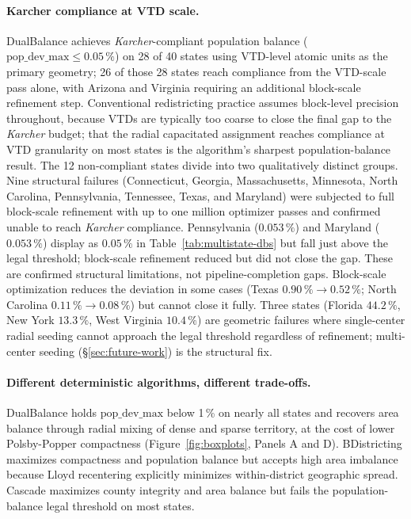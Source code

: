 \paragraph{Karcher compliance at VTD scale.}
DualBalance achieves \textit{Karcher}-compliant population balance
($\mathrm{pop\_dev\_max} \leq 0.05\,\%$) on 28 of 40 states using
VTD-level atomic units as the primary geometry; 26 of those 28 states
reach compliance from the VTD-scale pass alone, with Arizona and
Virginia requiring an additional block-scale refinement step.
Conventional redistricting practice assumes block-level precision
throughout, because VTDs are typically too coarse to close the final
gap to the \textit{Karcher} budget; that the radial capacitated
assignment reaches compliance at VTD granularity on most states is
the algorithm's sharpest population-balance result.
The 12 non-compliant states divide into two qualitatively distinct
groups. Nine structural failures (Connecticut, Georgia, Massachusetts,
Minnesota, North Carolina, Pennsylvania, Tennessee, Texas, and
Maryland) were subjected to full block-scale refinement with up to one
million optimizer passes and confirmed unable to reach
\textit{Karcher} compliance. Pennsylvania ($0.053\,\%$) and Maryland
($0.053\,\%$) display as $0.05\,\%$ in Table~\ref{tab:multistate-dbs}
but fall just above the legal threshold; block-scale refinement
reduced but did not close the gap. These are confirmed structural
limitations, not pipeline-completion gaps. Block-scale optimization
reduces the deviation in some cases (Texas $0.90\,\% \to 0.52\,\%$;
North Carolina $0.11\,\% \to 0.08\,\%$) but cannot close it fully.
Three states (Florida $44.2\,\%$, New York $13.3\,\%$,
West Virginia $10.4\,\%$) are geometric failures where single-center
radial seeding cannot approach the legal threshold regardless of
refinement; multi-center seeding (\S\ref{sec:future-work}) is the
structural fix.

\paragraph{Different deterministic algorithms, different trade-offs.}
DualBalance holds $\mathrm{pop\_dev\_max}$ below 1\,\% on nearly all
states and recovers area balance through radial mixing of dense and sparse
territory, at the cost of lower Polsby-Popper compactness
(Figure~\ref{fig:boxplots}, Panels A and D). BDistricting maximizes
compactness and population balance but accepts high area imbalance because
Lloyd recentering explicitly minimizes within-district geographic spread.
Cascade maximizes county integrity and area balance but fails the
population-balance legal threshold on most states.

